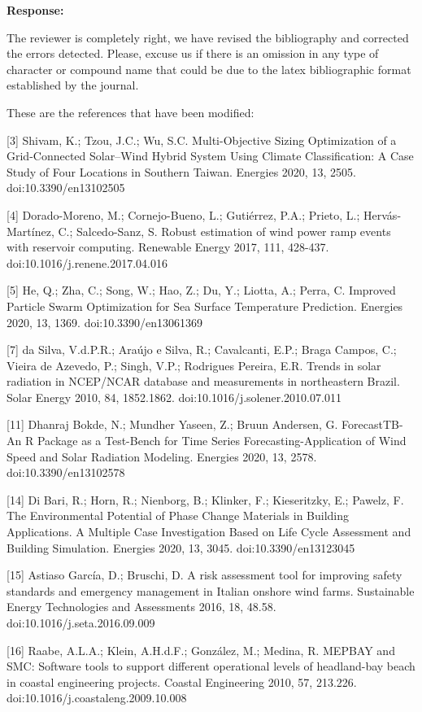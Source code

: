 \documentclass[a4paper,twoside,11pt]{article}
\begin{document}
\textbf{Response:}
{
The reviewer is completely right, we have revised the bibliography and corrected the errors detected. Please, excuse us if there is an omission in any type of character or compound name that could be due to the latex bibliographic format established by the journal.

These are the references that have been modified:

[3] Shivam, K.; Tzou, J.C.; Wu, S.C. Multi-Objective Sizing Optimization of a Grid-Connected Solar–Wind Hybrid System Using Climate Classification: A Case Study of Four Locations in Southern Taiwan. Energies 2020, 13, 2505. doi:10.3390/en13102505
    
[4] Dorado-Moreno, M.; Cornejo-Bueno, L.; Gutiérrez, P.A.; Prieto, L.; Hervás-Martínez, C.; Salcedo-Sanz, S. Robust estimation of wind power ramp events with reservoir computing. Renewable Energy 2017, 111, 428-437. doi:10.1016/j.renene.2017.04.016
    
[5] He, Q.; Zha, C.; Song, W.; Hao, Z.; Du, Y.; Liotta, A.; Perra, C. Improved Particle Swarm Optimization for Sea Surface Temperature Prediction. Energies 2020, 13, 1369. \newline doi:10.3390/en13061369
    
[7] da Silva, V.d.P.R.; Araújo e Silva, R.; Cavalcanti, E.P.; Braga Campos, C.; Vieira de Azevedo, P.; Singh, V.P.; Rodrigues Pereira, E.R. Trends in solar radiation in NCEP/NCAR database and measurements in northeastern Brazil. Solar Energy 2010, 84, 1852.1862. \newline doi:10.1016/j.solener.2010.07.011
    
[11] Dhanraj Bokde, N.; Mundher Yaseen, Z.; Bruun Andersen, G. ForecastTB-An R Package as a Test-Bench for Time Series Forecasting-Application of Wind Speed and Solar Radiation Modeling. Energies 2020, 13, 2578. doi:10.3390/en13102578

[14] Di Bari, R.; Horn, R.; Nienborg, B.; Klinker, F.; Kieseritzky, E.; Pawelz, F. The Environmental Potential of Phase Change Materials in Building Applications. A Multiple Case Investigation Based on Life Cycle Assessment and Building Simulation. Energies 2020, 13, 3045. doi:10.3390/en13123045
    
[15] Astiaso García, D.; Bruschi, D. A risk assessment tool for improving safety standards and emergency management in Italian onshore wind farms. Sustainable Energy Technologies and Assessments 2016, 18, 48.58. doi:10.1016/j.seta.2016.09.009
    
[16] Raabe, A.L.A.; Klein, A.H.d.F.; González, M.; Medina, R. MEPBAY and SMC: Software tools to support different operational levels of headland-bay beach in coastal engineering projects. Coastal Engineering 2010, 57, 213.226.  doi:10.1016/j.coastaleng.2009.10.008
    
}
\end{document}
